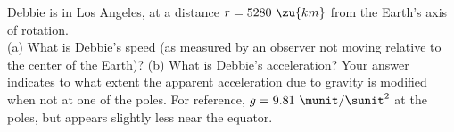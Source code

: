 Debbie is in Los Angeles, at a distance $r = 5280\ \zu{km}$ from the
Earth's axis of rotation.\\
%
(a) What is Debbie's speed (as measured by an observer not
moving relative to the center of the Earth)?\answercheck\hwendpart
%
(b) What is Debbie's acceleration? Your answer
indicates to what extent the apparent acceleration due to gravity is
modified when not at one of the poles. For reference, 
$g = 9.81\ \munit / \sunit^2$ at the poles, but appears slightly less near the
equator.\answercheck
